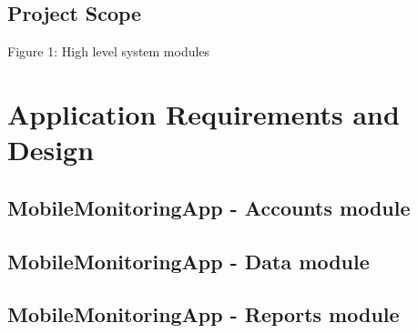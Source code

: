 \documentclass[hidelinks, 12pt, oneside]{article}
\begin{document}
	\subsection{Project Scope}
		{\centering
		
		\vspace{1cm}
		Figure 1: High level system modules
		}
	
	\section{Application Requirements and Design}
	\subsection{MobileMonitoringApp - Accounts module}
	
	\subsection{MobileMonitoringApp - Data module}
	
	\subsection{MobileMonitoringApp - Reports module}
		
\end{document}
